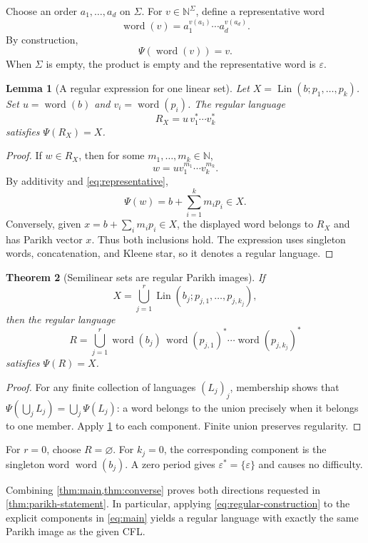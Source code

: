 \documentclass[11pt,a4paper]{article}
\numberwithin{equation}{section}
\theoremstyle{plain}
\newtheorem{theorem}{Theorem}[section]
\newtheorem{lemma}[theorem]{Lemma}
\theoremstyle{definition}
\theoremstyle{remark}
\newcommand{\N}{\mathbb N}
\newcommand{\eps}{\varepsilon}
\newcommand{\Lin}{\operatorname{Lin}}
\begin{document}
Choose an order $a_1,\ldots,a_d$ on $\Sigma$. For $v\in\N^\Sigma$, define a representative word
\[
\operatorname{word}(v)=a_1^{v(a_1)}\cdots a_d^{v(a_d)}.
\]
By construction,
\begin{equation}\label{eq:representative}
\Psi(\operatorname{word}(v))=v.
\end{equation}
When $\Sigma$ is empty, the product is empty and the representative word is $\eps$.

\begin{lemma}[A regular expression for one linear set]\label{lem:linear-regular}
Let $X=\Lin(b;p_1,\ldots,p_k)$. Set $u=\operatorname{word}(b)$ and $v_i=\operatorname{word}(p_i)$. The regular language
\[
R_X=u\,v_1^*\cdots v_k^*
\]
satisfies $\Psi(R_X)=X$.
\end{lemma}
\begin{proof}
If $w\in R_X$, then for some $m_1,\ldots,m_k\in\N$,
\[
w=u v_1^{m_1}\cdots v_k^{m_k}.
\]
By additivity and \eqref{eq:representative},
\[
\Psi(w)=b+\sum_{i=1}^k m_i p_i\in X.
\]
Conversely, given $x=b+\sum_i m_i p_i\in X$, the displayed word belongs to $R_X$ and has Parikh vector $x$. Thus both inclusions hold. The expression uses singleton words, concatenation, and Kleene star, so it denotes a regular language.
\end{proof}

\begin{theorem}[Semilinear sets are regular Parikh images]\label{thm:converse}
If
\[
X=\bigcup_{j=1}^r\Lin(b_j;p_{j,1},\ldots,p_{j,k_j}),
\]
then the regular language
\begin{equation}\label{eq:regular-construction}
R=\bigcup_{j=1}^r
\operatorname{word}(b_j)\,
\operatorname{word}(p_{j,1})^*\cdots
\operatorname{word}(p_{j,k_j})^*
\end{equation}
satisfies $\Psi(R)=X$.
\end{theorem}
\begin{proof}
For any finite collection of languages $(L_j)_j$, membership shows that
$\Psi(\bigcup_j L_j)=\bigcup_j\Psi(L_j)$: a word belongs to the union precisely when it belongs to one member. Apply \cref{lem:linear-regular} to each component. Finite union preserves regularity.
\end{proof}

For $r=0$, choose $R=\varnothing$. For $k_j=0$, the corresponding component is the singleton word $\operatorname{word}(b_j)$. A zero period gives $\eps^*=\{\eps\}$ and causes no difficulty.

Combining \cref{thm:main,thm:converse} proves both directions requested in \cref{thm:parikh-statement}. In particular, applying \eqref{eq:regular-construction} to the explicit components in \eqref{eq:main} yields a regular language with exactly the same Parikh image as the given CFL.
\end{document}

